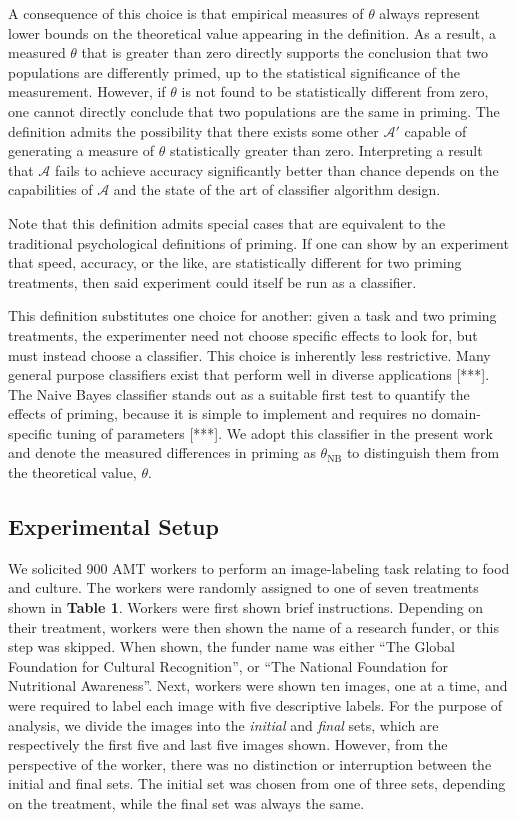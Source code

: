 \documentclass[a4paper]{report}
\begin{document}
A consequence of this choice is that empirical measures of $\theta$ always
represent lower bounds on the theoretical value appearing in the definition.
As a result, a measured $\theta$ that is greater than zero directly 
supports the conclusion that two populations are differently 
primed, up to the statistical significance of the measurement.  However, if 
$\theta$ is not found to be statistically different from zero, one cannot 
directly
conclude that two populations are the same in priming.  The definition
admits the possibility that there exists some other $\mathcal{A}'$ capable of 
generating a measure of $\theta$ statistically greater than zero. 
Interpreting a result
that $\mathcal{A}$ fails to achieve accuracy significantly better than 
chance depends on the capabilities of $\mathcal{A}$ and the state of the art
of classifier algorithm design.

Note that this definition admits special cases that are equivalent to the
traditional psychological definitions of priming.  If one can show by an
experiment that 
speed, accuracy, or the like, are statistically different for two priming 
treatments, then said experiment could itself be run as a classifier.

This definition substitutes one choice for another: given a task
and two priming treatments, the experimenter need not choose specific effects
to look for, but must instead choose a classifier.  This choice is inherently
less restrictive.  Many general purpose classifiers exist that perform
well in diverse applications [***].  The Naive Bayes classifier stands out as 
a suitable first test to quantify the effects of priming,
because it is simple to implement and requires no domain-specific tuning of 
parameters [***].  We adopt this classifier in the present work and 
denote the measured differences in priming as $\theta_\text{NB}$ to distinguish
them from the theoretical value, $\theta$.

\subsection*{Experimental Setup}
We solicited 900 AMT workers to perform an image-labeling task relating to
food and culture.  The workers were randomly assigned to one of seven 
treatments shown in \textbf{Table 1}.  Workers were first shown brief 
instructions.  Depending on their treatment, workers were then shown the 
name of a research funder, or this step was skipped.  When shown, 
the funder name was either
``The Global Foundation for Cultural Recognition'', or 
``The National Foundation for Nutritional Awareness''.  Next, workers were
shown ten images, one at a time, and were required to label each image with
five descriptive labels.  For the purpose of analysis, we divide the images
into the \textit{initial} and \textit{final} sets, which are respectively the 
first five and last five images shown.  However, from the perspective of the 
worker, there was no 
distinction or interruption between the initial and final sets. 
The initial set was chosen from one of three sets, depending on the 
treatment, while the final set was always the same.
\end{document}
